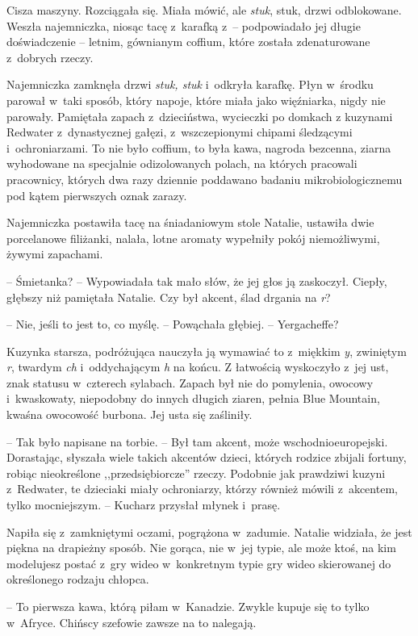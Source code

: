 \documentclass[oneside,polish,11pt,sfheadings]{mwbk}
\begin{document}
Cisza maszyny. Rozciągała się. Miała mówić, ale \textit{stuk}, stuk, drzwi
odblokowane. Weszła najemniczka, niosąc tacę z~karafką z~-- podpowiadało
jej długie doświadczenie -- letnim, gównianym coffium, które została
zdenaturowane z~dobrych rzeczy.

Najemniczka zamknęła drzwi \textit{stuk, stuk} i~odkryła karafkę. Płyn w~środku parował w~taki sposób, który napoje, które miała jako więźniarka,
nigdy nie parowały. Pamiętała zapach z~dzieciństwa, wycieczki po domkach
z kuzynami Redwater z~dynastycznej gałęzi, z~wszczepionymi chipami
śledzącymi i~ochroniarzami. To nie było coffium, to była kawa, nagroda
bezcenna, ziarna wyhodowane na specjalnie odizolowanych polach, na
których pracowali pracownicy, których dwa razy dziennie poddawano
badaniu mikrobiologicznemu pod kątem pierwszych oznak zarazy.

Najemniczka postawiła tacę na śniadaniowym stole Natalie, ustawiła dwie
porcelanowe filiżanki, nalała, lotne aromaty wypełniły pokój
niemożliwymi, żywymi zapachami.

-- Śmietanka? -- Wypowiadała tak mało słów, że jej głos ją zaskoczył.
Ciepły, głębszy niż pamiętała Natalie. Czy był akcent, ślad drgania na
\textit{r}?

-- Nie, jeśli to jest to, co myślę. -- Powąchała głębiej. -- Yergacheffe? 

Kuzynka starsza, podróżująca nauczyła ją wymawiać to z~miękkim \textit{y},
zwiniętym \textit{r}, twardym \textit{ch} i~oddychającym \textit{h} na końcu.
Z łatwością wyskoczyło z~jej ust, znak statusu w~czterech sylabach.
Zapach był nie do pomylenia, owocowy i~kwaskowaty, niepodobny do innych
długich ziaren, pełnia Blue Mountain, kwaśna owocowość burbona. Jej usta
się zaśliniły.

-- Tak było napisane na torbie. -- Był tam akcent, może
wschodnioeuropejski. Dorastając, słyszała wiele takich akcentów dzieci,
których rodzice zbijali fortuny, robiąc nieokreślone ,,przedsiębiorcze''
rzeczy. Podobnie jak prawdziwi kuzyni z~Redwater, te dzieciaki miały
ochroniarzy, którzy również mówili z~akcentem, tylko mocniejszym. -- Kucharz przysłał młynek i~prasę.

Napiła się z~zamkniętymi oczami, pogrążona w~zadumie. Natalie widziała,
że jest piękna na drapieżny sposób. Nie gorąca, nie w~jej typie, ale
może ktoś, na kim modelujesz postać z~gry wideo w~konkretnym typie gry
wideo skierowanej do określonego rodzaju chłopca. 

-- To pierwsza kawa,
którą piłam w~Kanadzie. Zwykle kupuje się to tylko w~Afryce. Chińscy
szefowie zawsze na to nalegają.
\end{document}
